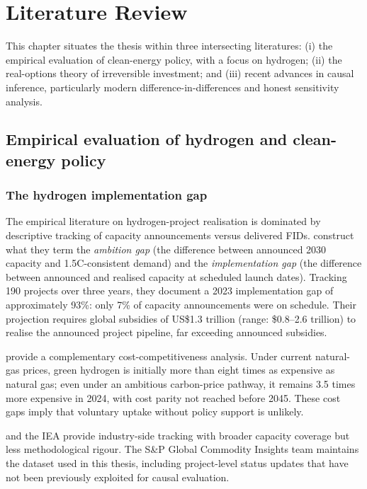 \chapter{Literature Review}
\label{ch:literature}

This chapter situates the thesis within three intersecting literatures: (i) the empirical evaluation of clean-energy policy, with a focus on hydrogen; (ii) the real-options theory of irreversible investment; and (iii) recent advances in causal inference, particularly modern difference-in-differences and honest sensitivity analysis.

\section{Empirical evaluation of hydrogen and clean-energy policy}
\label{sec:lit_hydrogen}

\subsection{The hydrogen implementation gap}

The empirical literature on hydrogen-project realisation is dominated by descriptive tracking of capacity announcements versus delivered FIDs. \cite{odenweller2025green} construct what they term the \emph{ambition gap} (the difference between announced 2030 capacity and 1.5\textdegree C-consistent demand) and the \emph{implementation gap} (the difference between announced and realised capacity at scheduled launch dates). Tracking 190 projects over three years, they document a 2023 implementation gap of approximately 93\%: only 7\% of capacity announcements were on schedule. Their projection requires global subsidies of US\$1.3 trillion (range: \$0.8--2.6 trillion) to realise the announced project pipeline, far exceeding announced subsidies.

\cite{ueckerdt2024cost} provide a complementary cost-competitiveness analysis. Under current natural-gas prices, green hydrogen is initially more than eight times as expensive as natural gas; even under an ambitious carbon-price pathway, it remains 3.5 times more expensive in 2024, with cost parity not reached before 2045. These cost gaps imply that voluntary uptake without policy support is unlikely.

\cite{hydrogen2024insights} and the IEA \cite{iea2024hydrogen} provide industry-side tracking with broader capacity coverage but less methodological rigour. The S\&P Global Commodity Insights team maintains the dataset used in this thesis, including project-level status updates that have not been previously exploited for causal evaluation.

